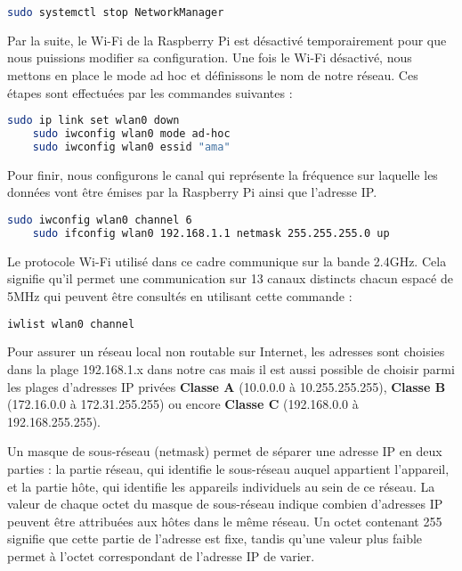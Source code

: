 \documentclass[a4paper,11pt]{article}
\begin{document}
\begin{lstlisting}[language=bash]
    sudo systemctl stop NetworkManager
\end{lstlisting}

\quad

Par la suite, le Wi-Fi de la Raspberry Pi est désactivé temporairement pour que nous puissions modifier sa configuration. Une fois le Wi-Fi désactivé, nous mettons en place le mode ad hoc et définissons le nom de notre réseau. Ces étapes sont effectuées par les commandes suivantes :  

\begin{lstlisting}[language=bash]
    sudo ip link set wlan0 down
    sudo iwconfig wlan0 mode ad-hoc
    sudo iwconfig wlan0 essid "ama" 
\end{lstlisting}

\quad

Pour finir, nous configurons le canal qui représente la fréquence sur laquelle les données vont être émises par la Raspberry Pi ainsi que l'adresse IP. 

\begin{lstlisting}[language=bash]
    sudo iwconfig wlan0 channel 6
    sudo ifconfig wlan0 192.168.1.1 netmask 255.255.255.0 up
\end{lstlisting}

\quad

Le protocole Wi-Fi utilisé dans ce cadre communique sur la bande 2.4GHz. Cela signifie qu'il permet une communication sur 13 canaux distincts chacun espacé de 5MHz qui peuvent être consultés en utilisant cette commande : 

\begin{lstlisting}[language=bash]
    iwlist wlan0 channel
\end{lstlisting}

Pour assurer un réseau local non routable sur Internet, les adresses sont choisies dans la plage 192.168.1.x dans notre cas mais il est aussi possible de choisir parmi les plages d’adresses IP privées \textbf{Classe A} (10.0.0.0 à 10.255.255.255), \textbf{Classe B} (172.16.0.0 à 172.31.255.255) ou encore \textbf{Classe C} (192.168.0.0 à 192.168.255.255).

\quad

Un masque de sous-réseau (netmask) permet de séparer une adresse IP en deux parties : la partie réseau, qui identifie le sous-réseau auquel appartient l'appareil, et la partie hôte, qui identifie les appareils individuels au sein de ce réseau. La valeur de chaque octet du masque de sous-réseau indique combien d'adresses IP peuvent être attribuées aux hôtes dans le même réseau. Un octet contenant 255 signifie que cette partie de l'adresse est fixe, tandis qu'une valeur plus faible permet à l'octet correspondant de l'adresse IP de varier.
\end{document}
